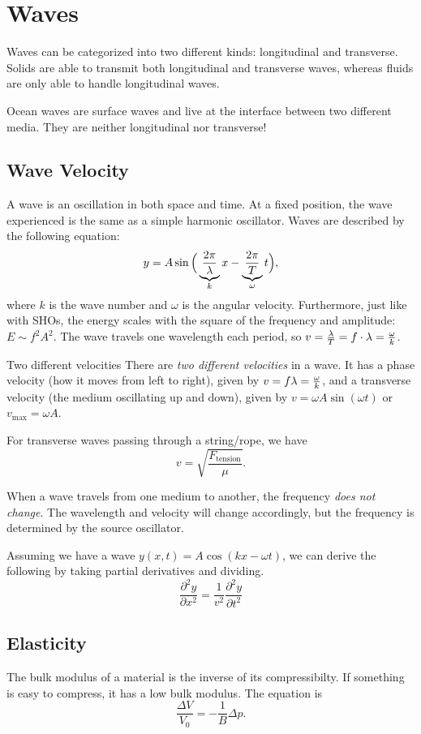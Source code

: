 \documentclass[class=article, crop=false]{standalone}
\begin{document}
  \section{Waves}
  Waves can be categorized into two different kinds: longitudinal and transverse. Solids are able to transmit both longitudinal and transverse waves, whereas fluids are only able to handle longitudinal waves.
  \begin{note}{}
    Ocean waves are surface waves and live at the interface between two different media. They are neither longitudinal nor transverse!
  \end{note}
  \subsection{Wave Velocity}
  A wave is an oscillation in both space and time. At a fixed position, the wave experienced is the same as a simple harmonic oscillator. Waves are described by the following equation:
  \[
    y = A\sin \Big(\underbrace{\frac{2\pi}{\lambda}}_{k}x-\underbrace{\frac{2\pi}{T}}_\omega t\Big),
  \]
  where $k$ is the wave number and $\omega$ is the angular velocity. Furthermore, just like with SHOs, the energy scales with the square of the frequency and amplitude: $E\sim f^2A^2$. The wave travels one wavelength each period, so $v = \frac{\lambda}{T}=f\cdot\lambda = \frac{\omega}{k}$.
  \begin{note}{Two different velocities}
    There are \emph{two different velocities} in a wave. It has a phase velocity (how it moves from left to right), given by $v = f\lambda = \frac{\omega}{k}$, and a transverse velocity (the medium oscillating up and down), given by $v = \omega A\sin(\omega t)$ or $v_{\text{max}} = \omega A$.
  \end{note}
  For transverse waves passing through a string/rope, we have
  \[
    v = \sqrt{\frac{F_{\text{tension}}}{\mu}}.
  \]
  \begin{note}{}
    When a wave travels from one medium to another, the frequency \emph{does not change}. The wavelength and velocity will change accordingly, but the frequency is determined by the source oscillator.
  \end{note}
  Assuming we have a wave $y(x, t) = A\cos(kx - \omega t)$, we can derive the following by taking partial derivatives and dividing.
  \[
    \frac{\partial^2y}{\partial x^2} = \frac{1}{v^2}\frac{\partial^2y}{\partial t^2}
  \]
  \subsection{Elasticity}
  The bulk modulus of a material is the inverse of its compressibilty. If something is easy to compress, it has a low bulk modulus. The equation is
  \[
    \frac{\Delta V}{V_0} = -\frac{1}{B}\Delta p.
  \]
\end{document}
